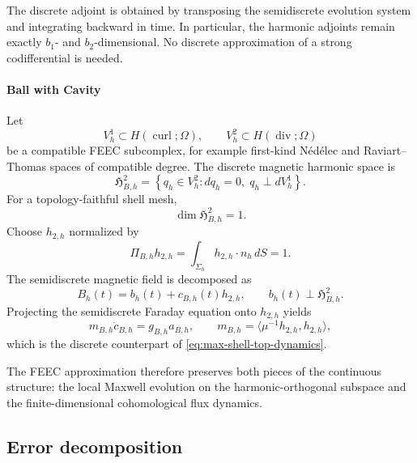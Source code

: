 \documentclass{article}
\DeclareMathOperator{\curl}{curl}
\DeclareMathOperator{\divergence}{div}
\newcommand{\ip}[2]{\langle #1,#2\rangle}
\begin{document}
The discrete adjoint is obtained by transposing the semidiscrete evolution system and integrating backward in time.  In particular, the harmonic adjoints remain exactly $b_1$- and $b_2$-dimensional.  No discrete approximation of a strong codifferential is needed.

\paragraph{Ball with Cavity}

Let
\[
  V_h^1\subset H(\curl;\Omega),
  \qquad
  V_h^2\subset H(\divergence;\Omega)
\]
be a compatible FEEC subcomplex, for example first-kind N\'ed\'elec
and Raviart--Thomas spaces of compatible degree.  The discrete
magnetic harmonic space is
\[
  \mathfrak H_{B,h}^2
  =
  \left\{
    q_h\in V_h^2:
    d q_h=0,\;
    q_h\perp dV_h^1
  \right\}.
\]
For a topology-faithful shell mesh,
\[
  \dim\mathfrak H_{B,h}^2=1.
\]
Choose $h_{2,h}$ normalized by
\begin{equation}
  \Pi_{B,h}h_{2,h}
  =
  \int_{\Sigma_h}h_{2,h}\cdot n_h\,dS
  =
  1.
\end{equation}
The semidiscrete magnetic field is decomposed as
\begin{equation}
  B_h(t)=b_h(t)+c_{B,h}(t)h_{2,h},
  \qquad
  b_h(t)\perp\mathfrak H_{B,h}^2.
\end{equation}
Projecting the semidiscrete Faraday equation onto $h_{2,h}$ yields
\begin{equation}
  m_{B,h}\dot c_{B,h}
  =
  g_{B,h}a_{B,h},
  \qquad
  m_{B,h}
  =
  \ip{\mu^{-1}h_{2,h}}{h_{2,h}},
\end{equation}
which is the discrete counterpart of
\eqref{eq:max-shell-top-dynamics}.

The FEEC approximation therefore preserves both pieces of the
continuous structure: the local Maxwell evolution on the
harmonic-orthogonal subspace and the finite-dimensional cohomological
flux dynamics.




\subsection{Error decomposition}
\label{sec:maxwell-error}
\end{document}
